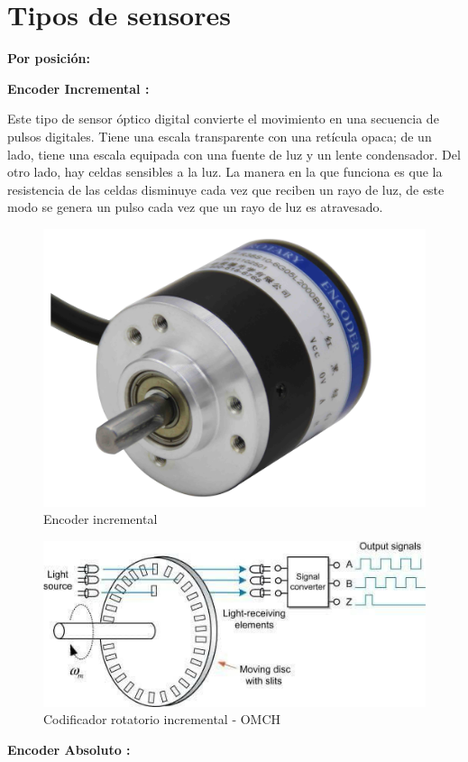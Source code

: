 \section{Tipos de sensores}
\vspace{10mm}
\textbf{Por posición:}
\vspace{5mm}

\textbf{Encoder Incremental :} 

Este tipo de sensor óptico digital convierte el movimiento en una secuencia de pulsos digitales. Tiene una escala transparente con una retícula opaca; de un lado, tiene una escala equipada con una fuente de luz y un lente condensador. Del otro lado, hay celdas sensibles a la luz. La manera en la que funciona es que la resistencia de las celdas disminuye cada vez que reciben un rayo de luz, de este modo se genera un pulso cada vez que un rayo de luz es atravesado.


\begin{figure}[h]
	\centering
	\includegraphics[width=0.4\linewidth]{portada/20150317193931229}
	\caption{Encoder incremental}
	\label{fig:20150317193931229}
\end{figure}

\begin{figure}[h]
	\centering
	\includegraphics[width=0.4\linewidth]{img/Sencoderincremental}
	\caption{Codificador rotatorio incremental - OMCH}
	\label{fig:Sencoderincremental}
\end{figure}
\vspace{10mm}
\textbf{Encoder Absoluto :} 


\newpage  %


